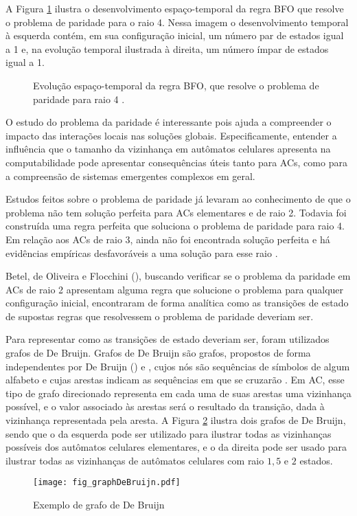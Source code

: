 A Figura \ref{fig:parity-rule} ilustra o desenvolvimento espaço-temporal da regra BFO \cite{Betel2013} que resolve o problema de paridade para o raio 4. Nessa imagem o desenvolvimento temporal à esquerda contém, em sua configuração inicial, um número par de estados igual a 1 e, na evolução temporal ilustrada à direita, um número ímpar de estados igual a 1.

\begin{figure}[h!]
\center
{}
\qquad
{}
\caption{Evolução espaço-temporal da regra BFO, que resolve o problema de paridade para raio 4 \cite{Betel2013}.}
\label{fig:parity-rule}
\end{figure}

O estudo do problema da paridade é interessante pois ajuda a compreender o impacto das interações locais nas soluções globais. Especificamente, entender a influência que o tamanho da vizinhança em autômatos celulares apresenta na computabilidade pode apresentar consequências úteis tanto para ACs, como para a compreensão de sistemas emergentes complexos em geral.

Estudos feitos sobre o problema de paridade já levaram ao conhecimento de que o problema não tem solução perfeita para ACs elementares e de raio 2. Todavia foi construída uma regra perfeita que soluciona o problema de paridade para raio 4. Em relação aos ACs de raio 3, ainda não foi encontrada solução perfeita e há evidências empíricas desfavoráveis a uma solução para esse raio \cite{Betel2013}.

Betel, de Oliveira e Flocchini (\citeyear{Betel2013}), buscando verificar se o problema da paridade em ACs de raio 2 apresentam alguma regra que solucione o problema para qualquer configuração inicial, encontraram de forma analítica como as transições de estado de supostas regras que resolvessem o problema de paridade deveriam ser. 

Para representar como as transições de estado deveriam ser, foram utilizados grafos de De Bruijn. Grafos de De Bruijn são grafos, propostos de forma independentes por De Bruijn (\citeyear{Bruijn946combinatorial}) e , cujos nós são sequências de símbolos de algum alfabeto e cujas arestas indicam as sequências em que se cruzarão \cite{weisstein2015deBruijn}. Em AC, esse tipo de grafo direcionado representa em cada uma de suas arestas uma vizinhança possível, e o valor associado às arestas será o resultado da transição, dada à vizinhança representada pela aresta. A Figura \ref{fig:grafosDeBruijnSample} ilustra dois grafos de De Bruijn, sendo que o da esquerda pode ser utilizado para ilustrar todas as vizinhanças possíveis dos autômatos celulares elementares, e o da direita pode ser usado para ilustrar todas as vizinhanças de autômatos celulares com raio $1,5$ e $2$ estados.
\begin{figure}[h!]
\centering
\texttt{[image: fig\_graphDeBruijn.pdf]}
\caption{Exemplo de grafo de De Bruijn \cite{Good1946normal}}
\label{fig:grafosDeBruijnSample}
\end{figure}

